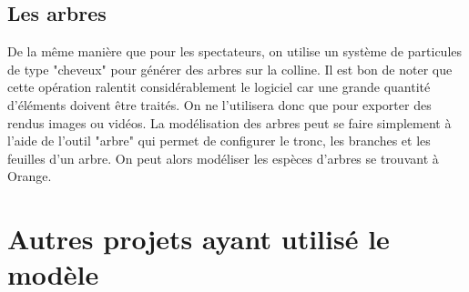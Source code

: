\subsection{Les arbres}
De la même manière que pour les spectateurs, on utilise un système de \glspl{particule} de type "cheveux" pour générer des arbres sur la colline. Il est bon de noter que cette opération ralentit considérablement le logiciel car une grande quantité d'éléments doivent être traités. On ne l'utilisera donc que pour exporter des rendus images ou vidéos. La modélisation des arbres peut se faire simplement à l'aide de l'outil "arbre" qui permet de configurer le tronc, les branches et les feuilles d'un arbre. On peut alors modéliser les espèces d'arbres se trouvant à Orange.


\section{Autres projets ayant utilisé le modèle}
\label{sect-autres}


